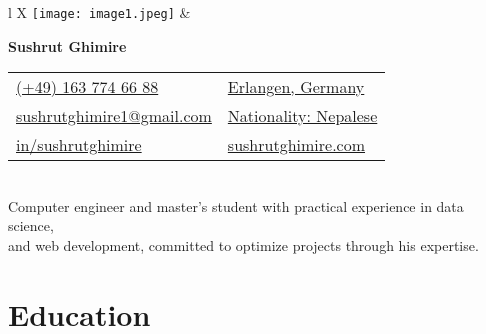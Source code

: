 \documentclass[10pt, letterpaper]{article}
\begin{document}
\begin{tabularx}{\textwidth}{l X}
    \texttt{[image: image1.jpeg]} & %
    
    \begin{minipage}{\textwidth}
        \vspace{-3.5cm} %
        \textbf{\fontsize{24 pt}{24 pt}\selectfont Sushrut Ghimire} \vspace{0.3cm} %
        
        \begin{tabular}{@{}p{} 
        p{}@{}}
        \href{x}{\color{black}{\footnotesize\faPhone*} \hspace*{0.13cm} (+49) 163 774 66 88} & 
        \href{x}{\color{black}{\footnotesize\faMapMarker*} \hspace*{0.13cm} Erlangen, Germany} \\[0.2cm]
        
        \href{mailto:sushrutghimire1@gmail.com}{sushrutghimire1@gmail.com} & \href{x}{\color{black} Nationality: Nepalese} \\[0.2cm]
        
        \href{https://www.linkedin.com/in/sushrut-ghimire/}{{\color{black}{\footnotesize\faLinkedinIn}} \hspace*{0.13cm} in/sushrutghimire} & 
        \href{https://www.sushrutghimire.com.np/}{{\color{black}{\footnotesize\faGlobe}} \hspace*{0.13cm} sushrutghimire.com} \\
        \end{tabular}
    \vspace{0.1cm} \\
    Computer engineer and master's student with practical experience in data science, \\ and web development, committed to optimize projects  through his expertise.
    \end{minipage}
\end{tabularx}

    \vspace{0.3 cm - 0.3 cm}

 \section{Education}
\end{document}
